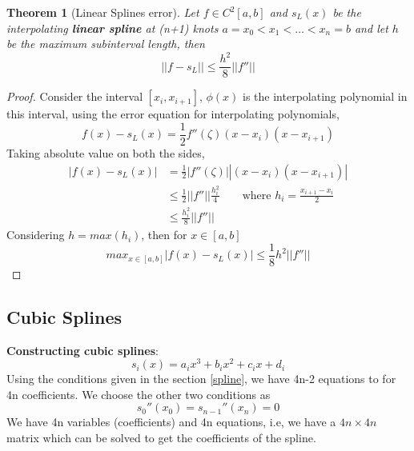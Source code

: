 \documentclass{article}
\newtheorem*{theorem}{Theorem}
\begin{document}
	\begin{theorem}[Linear Splines error]
	\label{linear}
		Let $f\in C^2[a,b]$ and $s_L(x)$ be the interpolating \textbf{linear spline} at (n+1) knots $a=x_0<x_1<\hdots<x_n=b$ and let $h$ be the maximum subinterval length, then
			\[\boxed{||f-s_L|| \leq \frac{h^2}{8} ||f''||}\] 
	\end{theorem}
	\begin{proof}
		Consider the interval $[x_i,x_{i+1}]$, $\phi(x)$ is the interpolating polynomial in this interval, using the error equation for interpolating polynomials,
		\[f(x)-s_L(x)=\frac{1}{2} f''(\zeta) (x-x_i)(x-x_{i+1})\]
		Taking absolute value on both the sides,
		\begin{align*}
			|f(x)-s_L(x)| &= \frac{1}{2} |f''(\zeta)| |(x-x_i)(x-x_{i+1})|\\
						&\leq \frac{1}{2} ||f''|| \frac{h_i^2}{4} \qquad \text{where $h_i = \frac{x_{i+1}-x_i}{2}$ }\\
						&\leq \frac{h_i^2}{8} ||f''||
		\end{align*}
		Considering $h=max (h_i)$, then for $x\in [a,b]$
			\[max_{x\in [a,b]}|f(x)-s_L(x)| \leq \frac{1}{8} h^2||f''||\]

	\end{proof}



\subsection{Cubic Splines}
	\textbf{Constructing cubic splines}:\\
	\[s_i(x) = a_ix^3 + b_ix^2 + c_ix +d_i\]
	Using the conditions given in the section \ref{spline}, we have 4n-2 equations to for 4n coefficients. We choose the other two conditions as 
	\[s_0''(x_0) = s_{n-1}''(x_n)=0\]
	We have 4n variables (coefficients) and 4n equations, i.e, we have a $4n\times4n$ matrix which can be solved to get the coefficients of the spline.\\
\end{document}
